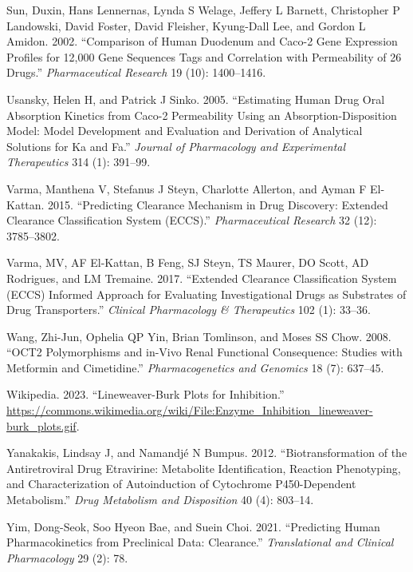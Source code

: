 \documentclass[
  11pt,
  krantz2, a4paper, twoside]{krantz}
\newlength{\cslhangindent}
\newenvironment{CSLReferences}[2] %
 {\begin{list}{}{%
  \setlength{\itemindent}{0pt}
  \setlength{\leftmargin}{0pt}
  \setlength{\parsep}{0pt}
  \ifodd #1
   \setlength{\leftmargin}{\cslhangindent}
   \setlength{\itemindent}{-1\cslhangindent}
  \fi
  \setlength{\itemsep}{#2\baselineskip}}}
 {\end{list}}
\begin{document}
\begin{CSLReferences}{1}{0}
Sun, Duxin, Hans Lennernas, Lynda S Welage, Jeffery L Barnett, Christopher P Landowski, David Foster, David Fleisher, Kyung-Dall Lee, and Gordon L Amidon. 2002. {``Comparison of Human Duodenum and Caco-2 Gene Expression Profiles for 12,000 Gene Sequences Tags and Correlation with Permeability of 26 Drugs.''} \emph{Pharmaceutical Research} 19 (10): 1400--1416.

Usansky, Helen H, and Patrick J Sinko. 2005. {``Estimating Human Drug Oral Absorption Kinetics from Caco-2 Permeability Using an Absorption-Disposition Model: Model Development and Evaluation and Derivation of Analytical Solutions for Ka and Fa.''} \emph{Journal of Pharmacology and Experimental Therapeutics} 314 (1): 391--99.

Varma, Manthena V, Stefanus J Steyn, Charlotte Allerton, and Ayman F El-Kattan. 2015. {``Predicting Clearance Mechanism in Drug Discovery: Extended Clearance Classification System (ECCS).''} \emph{Pharmaceutical Research} 32 (12): 3785--3802.

Varma, MV, AF El-Kattan, B Feng, SJ Steyn, TS Maurer, DO Scott, AD Rodrigues, and LM Tremaine. 2017. {``Extended Clearance Classification System (ECCS) Informed Approach for Evaluating Investigational Drugs as Substrates of Drug Transporters.''} \emph{Clinical Pharmacology \& Therapeutics} 102 (1): 33--36.

Wang, Zhi-Jun, Ophelia QP Yin, Brian Tomlinson, and Moses SS Chow. 2008. {``OCT2 Polymorphisms and in-Vivo Renal Functional Consequence: Studies with Metformin and Cimetidine.''} \emph{Pharmacogenetics and Genomics} 18 (7): 637--45.

Wikipedia. 2023. {``Lineweaver-Burk Plots for Inhibition.''} \url{https://commons.wikimedia.org/wiki/File:Enzyme_Inhibition_lineweaver-burk_plots.gif}.

Yanakakis, Lindsay J, and Namandjé N Bumpus. 2012. {``Biotransformation of the Antiretroviral Drug Etravirine: Metabolite Identification, Reaction Phenotyping, and Characterization of Autoinduction of Cytochrome P450-Dependent Metabolism.''} \emph{Drug Metabolism and Disposition} 40 (4): 803--14.

Yim, Dong-Seok, Soo Hyeon Bae, and Suein Choi. 2021. {``Predicting Human Pharmacokinetics from Preclinical Data: Clearance.''} \emph{Translational and Clinical Pharmacology} 29 (2): 78.


\end{CSLReferences}
\end{document}
